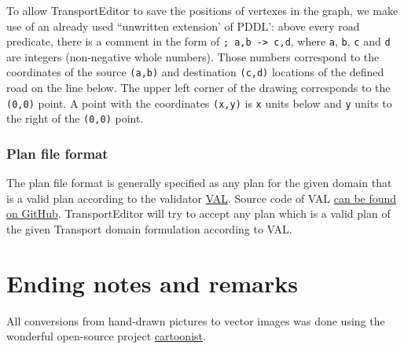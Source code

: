 \documentclass[10pt,a4paper,oneside]{article}
\newcommand{\pname}{TransportEditor} %
\begin{document}
To allow \pname{} to save the positions of vertexes in the graph, we make use of an already used ``unwritten extension' of PDDL':
above every road predicate, there is a comment in the form of \verb+; a,b -> c,d+,
where \verb+a+, \verb+b+, \verb+c+ and \verb+d+ are integers (non-negative whole numbers).
Those numbers correspond to the coordinates of the source \verb+(a,b)+ and destination \verb+(c,d)+ locations of the defined road on the line below. The upper left corner of the drawing corresponds to the \verb+(0,0)+ point. A point with the coordinates \verb+(x,y)+ is \verb+x+ units below and \verb+y+ units to the right of the \verb+(0,0)+ point.

\subsubsection{Plan file format}\label{plan-format}

The plan file format is generally specified as any plan for the given domain that is a valid plan according to the validator \href{http://www.inf.kcl.ac.uk/research/groups/PLANNING/index.php?option=com_content&view=article&id=70&Itemid=77}{VAL}. Source code of VAL \href{https://github.com/KCL-Planning/VAL}{can be found on GitHub}. \pname{} will try to accept any plan which is a valid plan of the given Transport domain formulation according to VAL.

\section{Ending notes and remarks}

All conversions from hand-drawn pictures to vector images was done using the wonderful
open-source project \href{https://github.com/honzajavorek/cartoonist}{cartoonist}.





{
\footnotesize %
%
}
\end{document}
